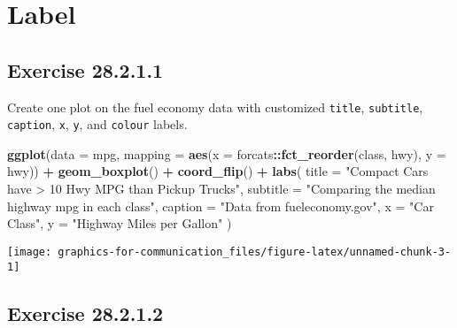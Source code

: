 \documentclass[]{book}
\newenvironment{Shaded}{\begin{snugshade}}{\end{snugshade}}
\newcommand{\DataTypeTok}[1]{\textcolor[rgb]{0.13,0.29,0.53}{#1}}
\newcommand{\KeywordTok}[1]{\textcolor[rgb]{0.13,0.29,0.53}{\textbf{#1}}}
\newcommand{\NormalTok}[1]{#1}
\newcommand{\OperatorTok}[1]{\textcolor[rgb]{0.81,0.36,0.00}{\textbf{#1}}}
\newcommand{\StringTok}[1]{\textcolor[rgb]{0.31,0.60,0.02}{#1}}
\theoremstyle{plain}
\theoremstyle{remark}
\begin{document}
\hypertarget{label}{%
\section{Label}\label{label}}

\hypertarget{exercise-28.2.1.1}{%
\subsection*{\texorpdfstring{Exercise
{28.2.1.1}}{Exercise 28.2.1.1}}\label{exercise-28.2.1.1}}

Create one plot on the fuel economy data with customized \texttt{title},
\texttt{subtitle}, \texttt{caption}, \texttt{x}, \texttt{y}, and
\texttt{colour} labels.

\begin{Shaded}
\begin{Highlighting}[]
\KeywordTok{ggplot}\NormalTok{(}\DataTypeTok{data =}\NormalTok{ mpg,}
       \DataTypeTok{mapping =} \KeywordTok{aes}\NormalTok{(}\DataTypeTok{x =}\NormalTok{ forcats}\OperatorTok{::}\KeywordTok{fct_reorder}\NormalTok{(class, hwy), }\DataTypeTok{y =}\NormalTok{ hwy)) }\OperatorTok{+}
\StringTok{  }\KeywordTok{geom_boxplot}\NormalTok{() }\OperatorTok{+}
\StringTok{  }\KeywordTok{coord_flip}\NormalTok{() }\OperatorTok{+}
\StringTok{  }\KeywordTok{labs}\NormalTok{(}
    \DataTypeTok{title =} \StringTok{"Compact Cars have > 10 Hwy MPG than Pickup Trucks"}\NormalTok{,}
    \DataTypeTok{subtitle =} \StringTok{"Comparing the median highway mpg in each class"}\NormalTok{,}
    \DataTypeTok{caption =} \StringTok{"Data from fueleconomy.gov"}\NormalTok{,}
    \DataTypeTok{x =} \StringTok{"Car Class"}\NormalTok{,}
    \DataTypeTok{y =} \StringTok{"Highway Miles per Gallon"}
\NormalTok{  )}
\end{Highlighting}
\end{Shaded}

\begin{center}\texttt{[image: graphics-for-communication\_files/figure-latex/unnamed-chunk-3-1]} \end{center}

\hypertarget{exercise-28.2.1.2}{%
\subsection*{\texorpdfstring{Exercise
{28.2.1.2}}{Exercise 28.2.1.2}}\label{exercise-28.2.1.2}}
\end{document}
